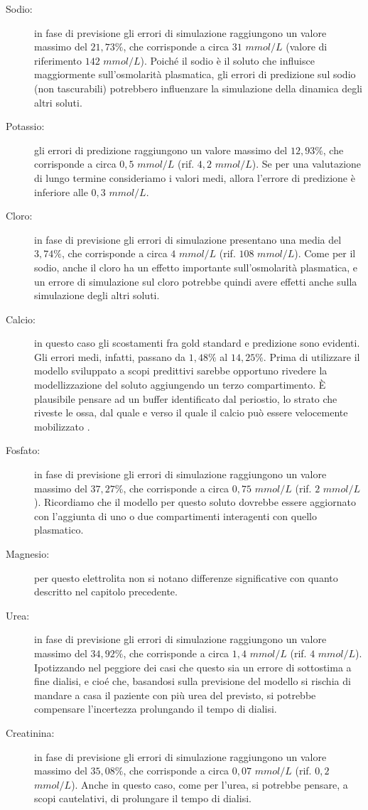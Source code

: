 \begin{description}
	\item[Sodio:] in fase di previsione gli errori di simulazione raggiungono un valore massimo del $21,73\%$, che corrisponde a circa $31$ $mmol/L$ (valore di riferimento $142$ $mmol/L$). Poiché il sodio è il soluto che influisce maggiormente sull'osmolarità plasmatica, gli errori di predizione sul sodio (non tascurabili) potrebbero influenzare la simulazione della dinamica degli altri soluti.
	\item[Potassio:] gli errori di predizione raggiungono un valore massimo del $12,93\%$, che corrisponde a circa $0,5$ $mmol/L$ (rif. $4,2$ $mmol/L$). Se per una valutazione di lungo termine consideriamo i valori medi, allora l'errore di predizione è inferiore alle $0,3$ $mmol/L$.
	\item[Cloro:] in fase di previsione gli errori di simulazione presentano una media del $3,74\%$, che corrisponde a circa $4$ $mmol/L$ (rif. $108$ $mmol/L$). Come per il sodio, anche il cloro ha un effetto importante sull'osmolarità plasmatica, e un errore di simulazione sul cloro potrebbe quindi avere effetti anche sulla simulazione degli altri soluti.
	\item[Calcio:] in questo caso gli scostamenti fra gold standard e predizione sono evidenti. Gli errori medi, infatti, passano da $1,48\%$ al $14,25\%$. Prima di utilizzare il modello sviluppato a scopi predittivi sarebbe opportuno rivedere la modellizzazione del soluto aggiungendo un terzo compartimento. È plausibile pensare ad un buffer identificato dal periostio, lo strato che riveste le ossa, dal quale e verso il quale il calcio può essere velocemente mobilizzato \cite{merulla}.
	\item[Fosfato:] in fase di previsione gli errori di simulazione raggiungono un valore massimo del $37,27\%$, che corrisponde a circa $0,75$ $mmol/L$ (rif. $2$ $mmol/L$). Ricordiamo che il modello per questo soluto dovrebbe essere aggiornato con l'aggiunta di uno o due compartimenti interagenti con quello plasmatico.
	\item[Magnesio:] per questo elettrolita non si notano differenze significative con quanto descritto nel capitolo precedente.
	\item[Urea:] in fase di previsione gli errori di simulazione raggiungono un valore massimo del $34,92\%$, che corrisponde a circa $1,4$ $mmol/L$ (rif. $4$ $mmol/L$). Ipotizzando nel peggiore dei casi che questo sia un errore di sottostima a fine dialisi, e cioé che, basandosi sulla previsione del modello si rischia di mandare a casa il paziente con più urea del previsto, si potrebbe compensare l'incertezza prolungando il tempo di dialisi.
	\item[Creatinina:] in fase di previsione gli errori di simulazione raggiungono un valore massimo del $35,08\%$, che corrisponde a circa $0,07$ $mmol/L$ (rif. $0,2$ $mmol/L$). Anche in questo caso, come per l'urea, si potrebbe pensare, a scopi cautelativi, di prolungare il tempo di dialisi.
\end{description}

